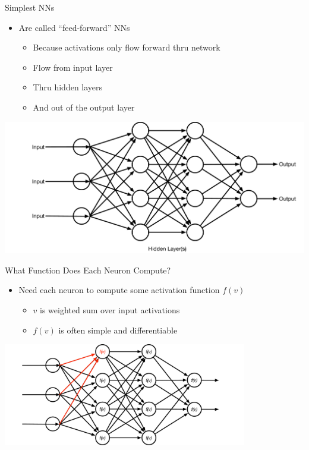 \documentclass[aspectratio=169]{beamer}
\begin{document}
\begin{frame}{Simplest NNs}

\begin{itemize}
	\item Are called ``feed-forward'' NNs 
	\begin{itemize}
		\item Because activations only flow forward thru network
		\item Flow from input layer
		\item Thru hidden layers
		\item And out of the output layer
	\end{itemize}
\end{itemize}
\includegraphics[width=.6\textwidth]{lectFF/nn.pdf}
\end{frame}
\begin{frame}{What Function Does Each Neuron Compute?}

\begin{itemize}
	\item Need each neuron to compute some  activation function $f(v)$
	\begin{itemize}
		\item $v$ is weighted sum over input activations
		\item $f(v)$ is often simple and differentiable
	\end{itemize}
\end{itemize}

\includegraphics[width=0.8\textwidth]{lectFF/nnFV.pdf}
\end{frame}
\end{document}
